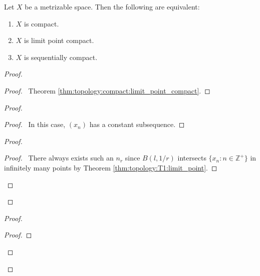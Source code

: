 \begin{thm}[DC]
  \label{thm:topology:metric:compact}
  Let $X$ be a metrizable space. Then the following are equivalent:
  \begin{enumerate}
    \item $X$ is compact.
    \item $X$ is limit point compact.
    \item $X$ is sequentially compact.
  \end{enumerate}
\end{thm}

\begin{proof}
  \pf
  \begin{proof}
    \pf\ Theorem \ref{thm:topology:compact:limit_point_compact}.
  \end{proof}
  \begin{proof}
    \begin{proof}
      \pf\ In this case, $(x_n)$ has a constant subsequence.
    \end{proof}
    \begin{proof}
      \begin{proof}
        \pf\ There always exists such an $n_r$ since $B(l, 1/r)$ intersects
        $\{ x_n : n \in \mathbb{Z}^+ \}$ in infinitely many points by
        Theorem \ref{thm:topology:T1:limit_point}.
      \end{proof}
    \end{proof}
  \end{proof}
  \begin{proof}
    \begin{proof}
\end{proof}
\end{proof}
\end{proof}
